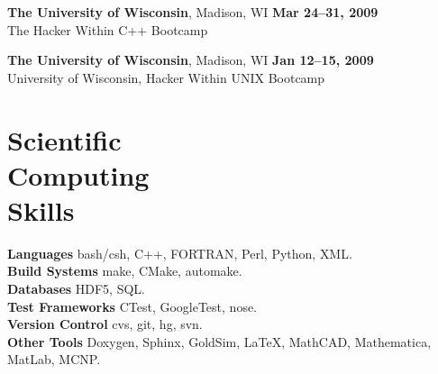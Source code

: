 \documentclass[margin,line]{resume}
\begin{document}
\begin{resume}
    \textbf{The University of Wisconsin}, Madison, WI \hfill \textbf{Mar 24--31, 2009}\\
    The Hacker Within C++ Bootcamp

    \textbf{The University of Wisconsin}, Madison, WI \hfill \textbf{Jan 12--15, 2009}\\
    University of Wisconsin, Hacker Within UNIX Bootcamp

    \vspace{5mm}
    \section{\mysidestyle Scientific\\Computing\\Skills} 
                \textbf{Languages} \hfill bash/csh, C++, FORTRAN, Perl, Python, XML.\vspace{.5mm}\\%
                \textbf{Build Systems} \hfill make, CMake, automake.\vspace{.5mm}\\%
                \textbf{Databases} \hfill HDF5, SQL.\vspace{.5mm}\\%
                \textbf{Test Frameworks} \hfill CTest, GoogleTest, nose.\vspace{.5mm}\\%
                \textbf{Version Control} \hfill cvs, git, hg, svn.\vspace{.5mm}\\%
                \textbf{Other Tools} \hfill Doxygen, Sphinx, GoldSim, \LaTeX, MathCAD, Mathematica, MatLab, MCNP.\vspace{.5mm}\\%


\end{resume}
\end{document}
